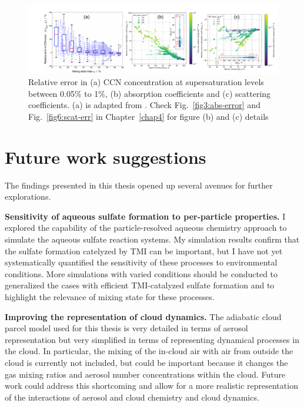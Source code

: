 \documentclass[edeposit,fullpage]{uiucthesis2009}
\begin{document}
\begin{figure}[H]
    \includegraphics[scale=0.35]{chap5_figs/chap5-fig2.pdf}
    \caption{Relative error in (a) CCN concentration at
      supersaturation levels between 0.05\% to 1\%, (b) absorption
      coefficients and (c) scattering coefficients. (a) is adapted
      from \citet{Ching2017}. Check Fig.~\ref{fig3:abs-error} and
      Fig.~\ref{fig6:scat-err} in Chapter~\ref{chap4} for figure (b)
      and (c) details}
    \label{chap5-fig2}
\end{figure}

\section{Future work suggestions}
The findings presented in this thesis opened up several avenues for
further explorations.

{\bf Sensitivity of aqueous sulfate formation to per-particle
  properties.} I explored the capability of the particle-resolved
aqueous chemistry approach to simulate the aqueous sulfate reaction
systems. My simulation results confirm that the sulfate formation
catelyzed by TMI can be important, but I have not yet systematically
quantified the sensitivity of these processes to environmental
conditions. More simulations with varied conditions should be
conducted to generalized the cases with efficient TMI-catalyzed
sulfate formation and to highlight the relevance of mixing state for
these processes.

{\bf Improving the representation of cloud dynamics.} The adiabatic
cloud parcel model used for this thesis is very detailed in terms of
aerosol representation but very simplified in terms of representing
dynamical processes in the cloud. In particular, the mixing of the
in-cloud air with air from outside the cloud is currently not
included, but could be important because it changes the gas mixing
ratios and aerosol number concentrations within the cloud. Future work
could address this shortcoming and allow for a more realistic
representation of the interactions of aerosol and cloud chemistry and
cloud dynamics.
\end{document}
